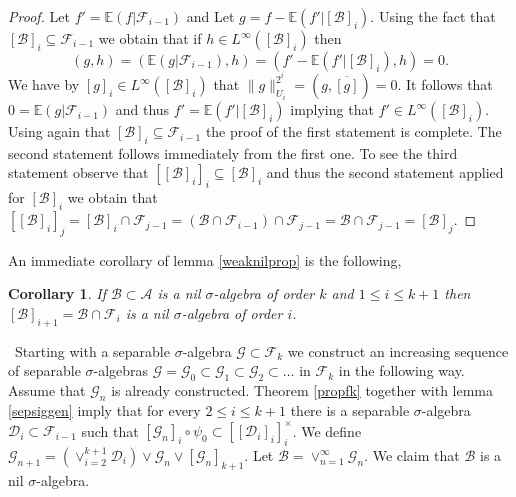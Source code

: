 \documentclass [11pt] {article}
\newtheorem{corollary}{Corollary}[section]
\begin{document}
\begin{proof} Let $f'=\mathbb{E}(f|\mathcal{F}_{i-1})$ and Let $g=f-\mathbb{E}(f'|[\mathcal{B}]_i)$. Using the fact that $[\mathcal{B}]_i\subseteq\mathcal{F}_{i-1}$ we obtain that if $h\in L^\infty([\mathcal{B}]_i)$ then $$(g,h)=(\mathbb{E}(g|\mathcal{F}_{i-1}),h)=(f'-\mathbb{E}(f'|[\mathcal{B}]_i),h)=0.$$ We have by $[g]_i\in L^\infty([\mathcal{B}]_i)$ that $\|g\|_{U_i}^{2^i}=(g,\overline{[g]})=0$. It follows that $0=\mathbb{E}(g|\mathcal{F}_{i-1})$ and thus $f'=\mathbb{E}(f'|[\mathcal{B}]_i)$ implying that $f'\in L^\infty([\mathcal{B}]_i)$. Using again that $[\mathcal{B}]_i\subseteq\mathcal{F}_{i-1}$ the proof of the first statement is complete. The second statement follows immediately from the first one.
To see the third statement observe that $[[\mathcal{B}]_i]_i\subseteq [\mathcal{B}]_i$ and thus the second statement applied for $[\mathcal{B}]_i$ we obtain that $[[\mathcal{B}]_i]_j=[\mathcal{B}]_i\cap\mathcal{F}_{j-1}=(\mathcal{B}\cap\mathcal{F}_{i-1})\cap\mathcal{F}_{j-1}
=\mathcal{B}\cap\mathcal{F}_{j-1}=[\mathcal{B}]_j$. 
\end{proof}

\medskip

An immediate corollary of lemma \ref{weaknilprop} is the following,

\begin{corollary}\label{nilsubnil} If $\mathcal{B}\subset\mathcal{A}$ is a nil $\sigma$-algebra of order $k$ and $1\leq i\leq k+1$ then $[\mathcal{B}]_{i+1}=\mathcal{B}\cap\mathcal{F}_i$ is a nil $\sigma$-algebra of order $i$.
\end{corollary}

\medskip

 
~Starting with a separable $\sigma$-algebra $\mathcal{G}\subset\mathcal{F}_k$ we construct an increasing sequence of separable $\sigma$-algebras $\mathcal{G}=\mathcal{G}_0\subset\mathcal{G}_1\subset\mathcal{G}_2\subset\dots$ in $\mathcal{F}_k$ in the following way. Assume that $\mathcal{G}_n$ is already constructed. 
Theorem \ref{propfk} together with lemma \ref{sepsiggen} imply that for every $2\leq i\leq k+1$ there is a separable $\sigma$-algebra $\mathcal{D}_i\subset\mathcal{F}_{i-1}$ such that $[\mathcal{G}_n]_i\circ\psi_0\subset [[\mathcal{D}_i]_i]_i^\times$. We define  $\mathcal{G}_{n+1}=(\vee_{i=2}^{k+1}\mathcal{D}_i)\vee\mathcal{G}_n\vee[\mathcal{G}_n]_{k+1}$. Let $\mathcal{B}=\vee_{n=1}^\infty\mathcal{G}_n$. We claim that $\mathcal{B}$ is a nil $\sigma$-algebra. 
\end{document}
